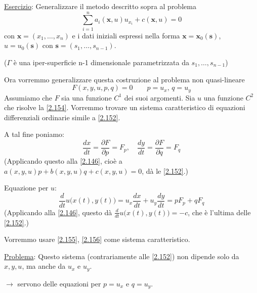 \documentclass[a4paper,11pt]{report}
\newcommand{\vect}[1]{\boldsymbol{#1}}
\newcommand{\x}{\boldsymbol{x}}
\begin{document}
\medskip

\underline{Esercizio}: Generalizzare il metodo descritto sopra al problema
\[
\sum_{i=1}^n a_i(\x,u)u_{x_i} + c(\x,u)=0
\]
con $\x = (x_1,\ldots,x_n)$ e i dati iniziali espressi nella forma $\x=\x_0(\vect{s})$, $u=u_0(\vect{s})$ con $\vect{s}=(s_1,\ldots,s_{n-1})$. 

($\Gamma$ \`e una iper-superficie n-1 dimensionale parametrizzata da $s_1,\ldots,s_{n-1}$)

\medskip

Ora vorremmo generalizzare questa costruzione al problema non quasi-lineare
\begin{equation}
F(x,y,u,p,q)=0 \qquad p=u_x,\, q=u_y
\label{2.154}
\end{equation}
Assumiamo che $F$ sia una funzione $C^1$ dei suoi argomenti.
Sia $u$ una funzione $C^2$ che risolve la \eqref{2.154}.
Vorremmo trovare un sistema caratteristico di equazioni differenziali ordinarie simile a \eqref{2.152}.

A tal fine poniamo:
\begin{equation}
\frac{dx}{dt}=\frac{\partial F}{\partial p}=F_p, \quad \frac{dy}{dt}=\frac{\partial F}{\partial q}=F_q
\label{2.155}
\end{equation}
(Applicando questo alla \eqref{2.146}, cio\`e a $a(x,y,u)p + b(x,y,u)q + c(x,y,u)=0$, d\`a le \eqref{2.152}.)

Equazione per $u$:
\begin{equation}
\frac{d}{dt}u\big(x(t),y(t)\big) = u_x \frac{dx}{dt}+u_y\frac{dy}{dt}=p F_p + q F_q 
\label{2.156}
\end{equation}
(Applicando alla \eqref{2.146}, questo d\`a $\frac{d}{dt}u\big(x(t),y(t)\big)=-c$, che \`e l'ultima delle \eqref{2.152}.)

Vorremmo usare \eqref{2.155}, \eqref{2.156} come sistema caratteristico.

\underline{Problema}: Questo sistema (contrariamente alle \eqref{2.152}) non dipende solo da $x,y,u$, ma anche da $u_x$ e $u_y$.

$\rightarrow$ servono delle equazioni per $p=u_x$ e $q=u_y$.
\end{document}
